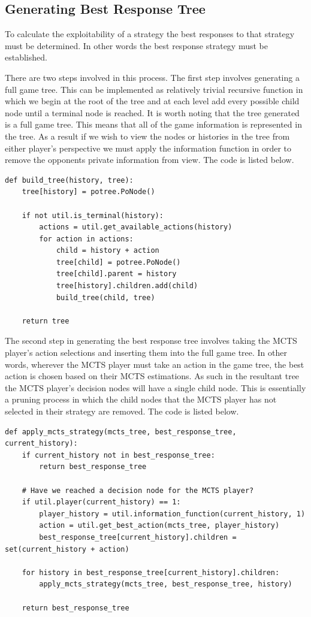 \subsection{Generating Best Response Tree}\label{subsec:applyMCTS}
To calculate the exploitability of a strategy the best responses to that strategy must be
determined.
In other words the best response strategy must be established.

There are two steps involved in this process.
The first step involves generating a full game tree.
This can be implemented as relatively trivial recursive function in which we begin at the root of the
tree and at each level add every possible child node until a terminal node is reached.
It is worth noting that the tree generated is a full game tree.
This means that all of the game information is represented in the tree.
As a result if we wish to view the nodes or histories in the tree from either player's perspective we must apply
the information function in order to remove the opponents private information from view.
The code is listed below.

\begin{lstlisting}[style=Python]
def build_tree(history, tree):
    tree[history] = potree.PoNode()

    if not util.is_terminal(history):
        actions = util.get_available_actions(history)
        for action in actions:
            child = history + action
            tree[child] = potree.PoNode()
            tree[child].parent = history
            tree[history].children.add(child)
            build_tree(child, tree)

    return tree
\end{lstlisting}

The second step in generating the best response tree involves taking the MCTS player's action
selections and inserting them into the full game tree\citep{heinrich2017reinforcement}.
In other words, wherever the MCTS player must take an action in the game tree, the best action is chosen
based on their MCTS estimations.
As such in the resultant tree the MCTS player's decision nodes will have
a single child node.
This is essentially a pruning process in which the child nodes that the MCTS player has
not selected in their strategy are removed.
The code is listed below.

\begin{lstlisting}[style=Python]
def apply_mcts_strategy(mcts_tree, best_response_tree, current_history):
    if current_history not in best_response_tree:
        return best_response_tree

    # Have we reached a decision node for the MCTS player?
    if util.player(current_history) == 1:
        player_history = util.information_function(current_history, 1)
        action = util.get_best_action(mcts_tree, player_history)
        best_response_tree[current_history].children = set(current_history + action)

    for history in best_response_tree[current_history].children:
        apply_mcts_strategy(mcts_tree, best_response_tree, history)

    return best_response_tree
\end{lstlisting}

